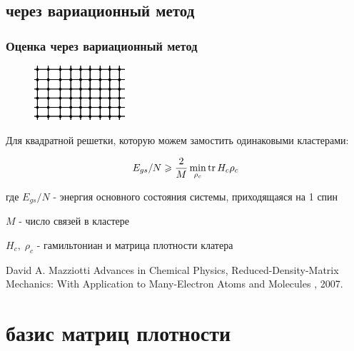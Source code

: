 \documentclass{beamer}
\begin{document}
\subsection{через вариационный метод}
\begin{frame}
\frametitle{Оценка через вариационный метод}
\begin{figure}
\includegraphics[width=0.3\textwidth]{lattice.png}
\end{figure}

Для квадратной решетки, которую можем замостить одинаковыми кластерами:
\vspace{1em}

$$E_{gs}/N \geqslant \frac{2}{M}\min_{\rho_c}\mathrm{tr} \,H_c\rho_c$$

\vspace{1em}
где $E_{gs}/N$ - энергия основного состояния системы, приходящаяся на 1 спин

$M$ - число связей в кластере

$H_c,\;\rho_c$ - гамильтониан и матрица плотности клатера 

\footnotesize{
\begin{thebibliography}{99}
David A. Mazziotti
\newblock Advances in Chemical Physics, Reduced-Density-Matrix Mechanics: With Application to Many-Electron Atoms and Molecules
, 2007.
\end{thebibliography}
}

\end{frame}
\section{базис матриц плотности}
\end{document}

